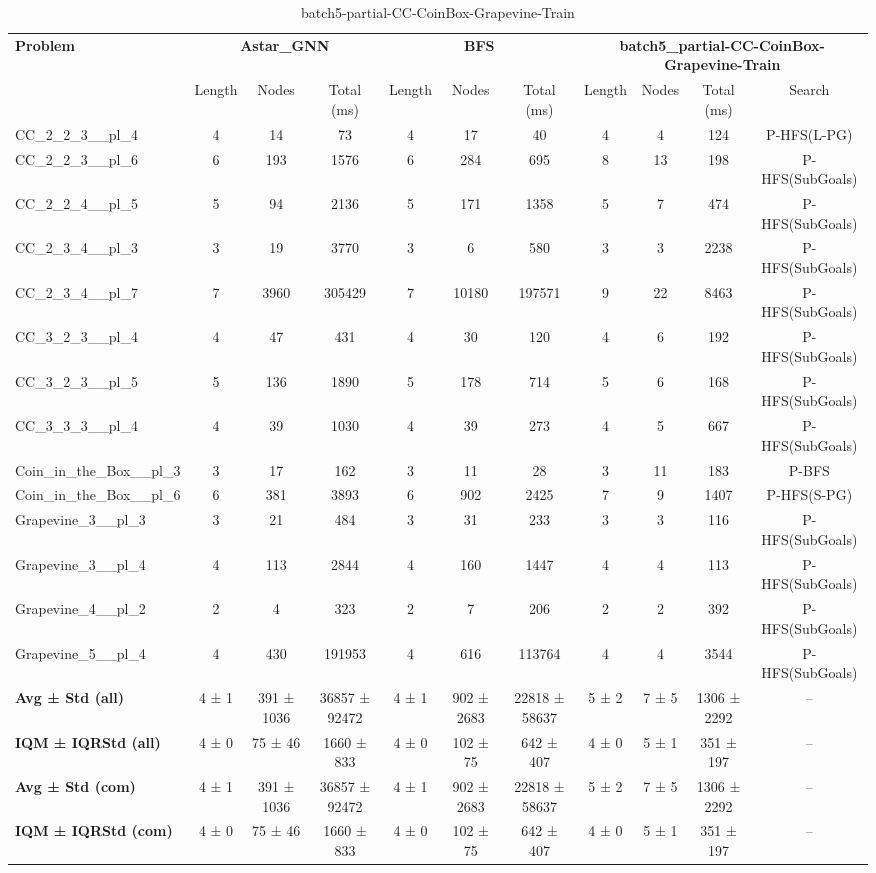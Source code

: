 \begin{table}[!ht]
\centering
\scriptsize
\begin{tabular}{l|ccc|ccc|cccc}
\multirow{2}{*}{\textbf{Problem}} & \multicolumn{3}{c|}{\textbf{Astar\_GNN}} & \multicolumn{3}{c|}{\textbf{BFS}} & \multicolumn{4}{c}{\textbf{batch5\_partial-CC-CoinBox-Grapevine-Train}} \\
\cline{2-11}
& Length & Nodes & Total (ms) & Length & Nodes & Total (ms) & Length & Nodes & Total (ms) & Search \\
\hline
CC\_2\_2\_3\_\_pl\_4 & 4 & 14 & 73 & 4 & 17 & 40 & 4 & 4 & 124 & P-HFS(L-PG) \\
CC\_2\_2\_3\_\_pl\_6 & 6 & 193 & 1576 & 6 & 284 & 695 & 8 & 13 & 198 & P-HFS(SubGoals) \\
CC\_2\_2\_4\_\_pl\_5 & 5 & 94 & 2136 & 5 & 171 & 1358 & 5 & 7 & 474 & P-HFS(SubGoals) \\
CC\_2\_3\_4\_\_pl\_3 & 3 & 19 & 3770 & 3 & 6 & 580 & 3 & 3 & 2238 & P-HFS(SubGoals) \\
CC\_2\_3\_4\_\_pl\_7 & 7 & 3960 & 305429 & 7 & 10180 & 197571 & 9 & 22 & 8463 & P-HFS(SubGoals) \\
CC\_3\_2\_3\_\_pl\_4 & 4 & 47 & 431 & 4 & 30 & 120 & 4 & 6 & 192 & P-HFS(SubGoals) \\
CC\_3\_2\_3\_\_pl\_5 & 5 & 136 & 1890 & 5 & 178 & 714 & 5 & 6 & 168 & P-HFS(SubGoals) \\
CC\_3\_3\_3\_\_pl\_4 & 4 & 39 & 1030 & 4 & 39 & 273 & 4 & 5 & 667 & P-HFS(SubGoals) \\
Coin\_in\_the\_Box\_\_pl\_3 & 3 & 17 & 162 & 3 & 11 & 28 & 3 & 11 & 183 & P-BFS \\
Coin\_in\_the\_Box\_\_pl\_6 & 6 & 381 & 3893 & 6 & 902 & 2425 & 7 & 9 & 1407 & P-HFS(S-PG) \\
Grapevine\_3\_\_pl\_3 & 3 & 21 & 484 & 3 & 31 & 233 & 3 & 3 & 116 & P-HFS(SubGoals) \\
Grapevine\_3\_\_pl\_4 & 4 & 113 & 2844 & 4 & 160 & 1447 & 4 & 4 & 113 & P-HFS(SubGoals) \\
Grapevine\_4\_\_pl\_2 & 2 & 4 & 323 & 2 & 7 & 206 & 2 & 2 & 392 & P-HFS(SubGoals) \\
Grapevine\_5\_\_pl\_4 & 4 & 430 & 191953 & 4 & 616 & 113764 & 4 & 4 & 3544 & P-HFS(SubGoals) \\
\hline
\textbf{Avg ± Std (all)} & 4 ± 1 & 391 ± 1036 & 36857 ± 92472 & 4 ± 1 & 902 ± 2683 & 22818 ± 58637 & 5 ± 2 & 7 ± 5 & 1306 ± 2292 & -- \\
\textbf{IQM ± IQRStd (all)} & 4 ± 0 & 75 ± 46 & 1660 ± 833 & 4 ± 0 & 102 ± 75 & 642 ± 407 & 4 ± 0 & 5 ± 1 & 351 ± 197 & -- \\
\textbf{Avg ± Std (com)} & 4 ± 1 & 391 ± 1036 & 36857 ± 92472 & 4 ± 1 & 902 ± 2683 & 22818 ± 58637 & 5 ± 2 & 7 ± 5 & 1306 ± 2292 & -- \\
\textbf{IQM ± IQRStd (com)} & 4 ± 0 & 75 ± 46 & 1660 ± 833 & 4 ± 0 & 102 ± 75 & 642 ± 407 & 4 ± 0 & 5 ± 1 & 351 ± 197 & -- \\
\end{tabular}
\caption{batch5-partial-CC-CoinBox-Grapevine-Train}
\label{tab:batch5_partial_CC-CoinBox-Grapevine_comparison_train}
\end{table}

